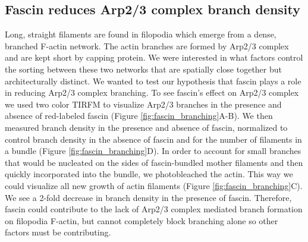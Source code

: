 \subsection{Fascin reduces Arp2/3 complex branch density}
Long, straight filaments are found in filopodia which emerge from a dense, branched F-actin network. The actin branches are formed by Arp2/3 complex and are kept short by capping protein. We were interested in what factors control the sorting between these two networks that are spatially close together but architecturally distinct. We wanted to test our hypothesis that fascin plays a role in reducing Arp2/3 complex branching. To see fascin's effect on Arp2/3 complex we used two color TIRFM to visualize Arp2/3 branches in the presence and absence of red-labeled fascin (Figure \ref{fig:fascin_branching}A-B). We then measured branch density in the presence and absence of fascin, normalized to control branch density in the absence of fascin and for the number of filaments in a bundle (Figure \ref{fig:fascin_branching}D). In order to account for small branches that would be nucleated on the sides of fascin-bundled mother filaments and then quickly incorporated into the bundle, we photobleached the actin. This way we could visualize all new growth of actin filaments (Figure \ref{fig:fascin_branching}C). We see a 2-fold decrease in branch density in the presence of fascin. Therefore, fascin could contribute to the lack of Arp2/3 complex mediated branch formation on filopodia F-actin, but cannot completely block branching alone so other factors must be contributing. 

